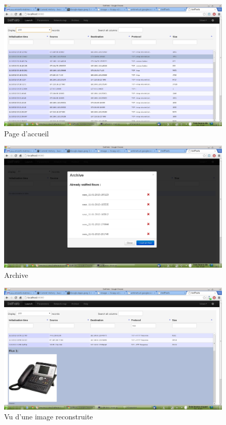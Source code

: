 
\begin{figure}[h!]
\centering
\includegraphics[scale=0.5]{NormalView.png}
\caption{Page d'accueil}
\label{NormalView}
\end{figure}

\begin{figure}[h!]
\centering
\includegraphics[scale=0.5]{Archive.png}
\caption{Archive}
\label{Archive}
\end{figure}

\begin{figure}[h!]
\centering
\includegraphics[scale=0.5]{DetailView.png}
\caption{Vu d'une image reconstruite}
\label{DetailView}
\end{figure}
